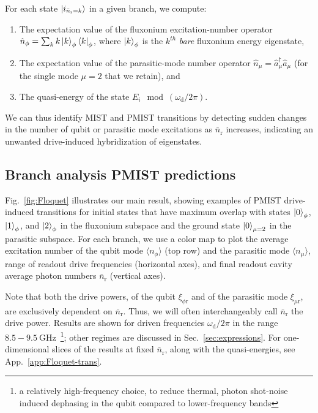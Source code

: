 \documentclass[%
reprint,
superscriptaddress,
 amsmath,amssymb,
 aps,
 prx,
longbibliography,
floatfix,
]{revtex4-2}
\begin{document}
For each state $\ket{i_{\bar n_\textrm{r}=k}}$ in a given branch, we compute:
\begin{enumerate}
    \item The expectation value of the fluxonium excitation-number operator $\hat n_\phi=\sum_k k\ket{k}_\phi\bra{k}_\phi$, where $\ket{k}_\phi$ is the $k^{th}$ {\it bare} fluxonium energy eigenstate,
    \item The expectation value of the parasitic-mode number operator $\hat n_\mu=\hat a_{\mu}^\dagger \hat a_{\mu}$ (for the single mode $\mu=2$ that we retain), and 
    \item The quasi-energy of the state $E_i \mod (\omega_\textrm{d}/2\pi)$.
\end{enumerate}
We can thus identify MIST and PMIST transitions by detecting sudden changes in the number of qubit or parasitic mode excitations as $\bar{n}_\textrm{r}$ increases, indicating an unwanted drive-induced hybridization of eigenstates.


\subsection{Branch analysis PMIST predictions}

Fig.~\ref{fig:Floquet} illustrates our main result, showing examples of PMIST drive-induced transitions for initial states that have maximum overlap with states $\ket{0}_\phi$, $\ket{1}_\phi$, and $\ket{2}_\phi$ in the fluxonium subspace and the ground state $\ket{0}_{\mu=2}$ in the parasitic subspace. For each branch, we use a color map to plot the average excitation number of the qubit mode $\langle n_\phi \rangle$ (top row) and the parasitic mode $\langle n_\mu \rangle$, range of readout drive frequencies (horizontal axes), and final readout cavity average photon numbers $ \bar n_\textrm{r}$ (vertical axes).

Note that both the drive powers, of the qubit $\xi_{\phi \textrm{r}}$ and of the parasitic mode $\xi_{\mu \textrm{r}}$, are exclusively dependent on $\bar n_\textrm{r}$. Thus, we will often interchangeably call $\bar n_\textrm{r}$ the drive power. Results are shown for driven frequencies $\omega_\textrm{d} / 2 \pi$ in the range $8.5 - 9.5 \ \mathrm{GHz}$~\footnote{a relatively high-frequency choice, to reduce thermal, photon shot-noise induced dephasing in the qubit compared to lower-frequency bands}; other regimes are discussed in Sec.~\ref{sec:expressions}. For one-dimensional slices of the results at fixed $\bar n_\textrm{r}$, along with the quasi-energies, see App.~\ref{app:Floquet-trans}.
\end{document}
